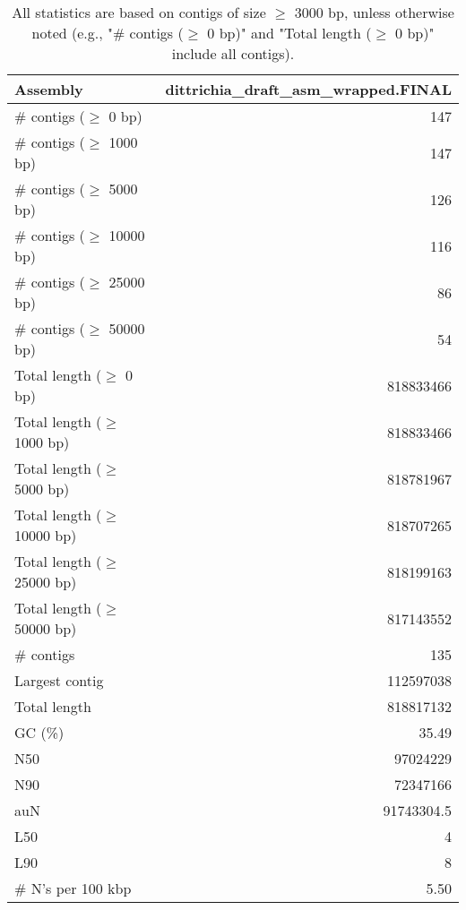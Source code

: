\documentclass[12pt,a4paper]{article}
\begin{document}
\begin{table}[ht]
\begin{center}
\caption{All statistics are based on contigs of size $\geq$ 3000 bp, unless otherwise noted (e.g., "\# contigs ($\geq$ 0 bp)" and "Total length ($\geq$ 0 bp)" include all contigs).}
\begin{tabular}{|l*{1}{|r}|}
\hline
Assembly & dittrichia\_draft\_asm\_wrapped.FINAL \\ \hline
\# contigs ($\geq$ 0 bp) & 147 \\ \hline
\# contigs ($\geq$ 1000 bp) & 147 \\ \hline
\# contigs ($\geq$ 5000 bp) & 126 \\ \hline
\# contigs ($\geq$ 10000 bp) & 116 \\ \hline
\# contigs ($\geq$ 25000 bp) & 86 \\ \hline
\# contigs ($\geq$ 50000 bp) & 54 \\ \hline
Total length ($\geq$ 0 bp) & 818833466 \\ \hline
Total length ($\geq$ 1000 bp) & 818833466 \\ \hline
Total length ($\geq$ 5000 bp) & 818781967 \\ \hline
Total length ($\geq$ 10000 bp) & 818707265 \\ \hline
Total length ($\geq$ 25000 bp) & 818199163 \\ \hline
Total length ($\geq$ 50000 bp) & 817143552 \\ \hline
\# contigs & 135 \\ \hline
Largest contig & 112597038 \\ \hline
Total length & 818817132 \\ \hline
GC (\%) & 35.49 \\ \hline
N50 & 97024229 \\ \hline
N90 & 72347166 \\ \hline
auN & 91743304.5 \\ \hline
L50 & 4 \\ \hline
L90 & 8 \\ \hline
\# N's per 100 kbp & 5.50 \\ \hline
\end{tabular}
\end{center}
\end{table}
\end{document}
